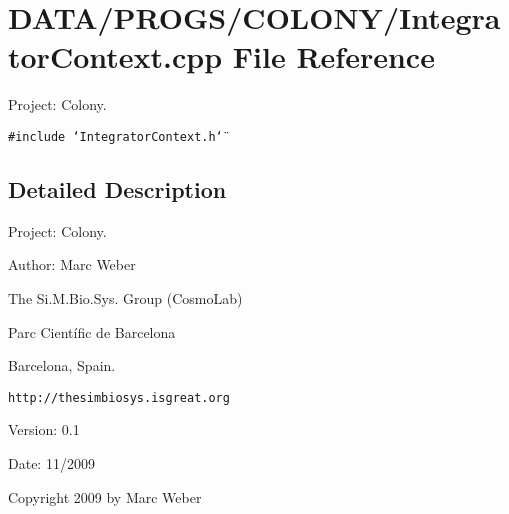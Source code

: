 \section{DATA/PROGS/COLONY/IntegratorContext.cpp File Reference}
\label{IntegratorContext_8cpp}
Project: Colony. 

{\tt \#include \char`\"{}IntegratorContext.h\char`\"{}}\par


\subsection{Detailed Description}
Project: Colony. 

\begin{Desc}
\item[Author:]Marc Weber\par
 The Si.M.Bio.Sys. Group (CosmoLab)\par
 Parc Científic de Barcelona\par
 Barcelona, Spain.\par
 {\tt http://thesimbiosys.isgreat.org} \end{Desc}
\begin{Desc}
\item[Version:]0.1 \end{Desc}
\begin{Desc}
\item[Date:]11/2009\end{Desc}
Copyright 2009 by Marc Weber 